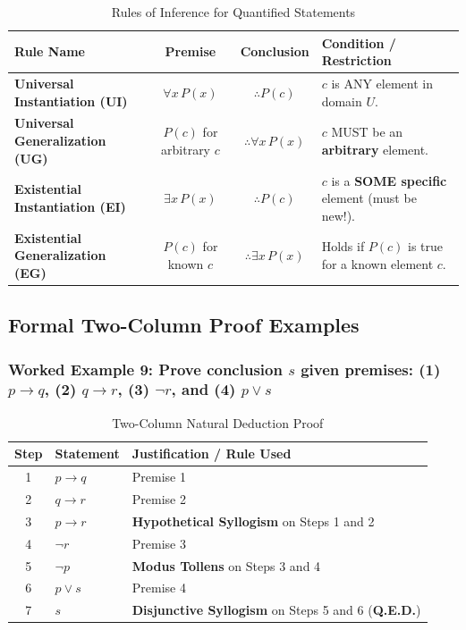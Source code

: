 \documentclass[11pt,a4paper]{article}
\begin{document}
\begin{table}[htbp]
\centering
\small
\begin{tabularx}{\textwidth}{|l|c|c|X|}
\hline
\rowcolor{secondaryteal} \color{white}\textbf{Rule Name} & \color{white}\textbf{Premise} & \color{white}\textbf{Conclusion} & \color{white}\textbf{Condition / Restriction} \\ \hline
\textbf{Universal Instantiation (UI)} & $\forall x \, P(x)$ & $\therefore P(c)$ & $c$ is ANY element in domain $U$. \\ \hline
\textbf{Universal Generalization (UG)} & $P(c)$ for arbitrary $c$ & $\therefore \forall x \, P(x)$ & $c$ MUST be an \textbf{arbitrary} element. \\ \hline
\textbf{Existential Instantiation (EI)} & $\exists x \, P(x)$ & $\therefore P(c)$ & $c$ is a \textbf{SOME specific} element (must be new!). \\ \hline
\textbf{Existential Generalization (EG)} & $P(c)$ for known $c$ & $\therefore \exists x \, P(x)$ & Holds if $P(c)$ is true for a known element $c$. \\ \hline
\end{tabularx}
\caption{Rules of Inference for Quantified Statements}
\end{table}

\subsection{Formal Two-Column Proof Examples}

\subsubsection*{Worked Example 9: Prove conclusion $s$ given premises: (1) $p \rightarrow q$, (2) $q \rightarrow r$, (3) $\neg r$, and (4) $p \lor s$}

\begin{table}[htbp]
\centering
\small
\begin{tabularx}{\textwidth}{|c|X|X|}
\hline
\rowcolor{primaryblue} \color{white}\textbf{Step} & \color{white}\textbf{Statement} & \color{white}\textbf{Justification / Rule Used} \\ \hline
1 & $p \rightarrow q$ & Premise 1 \\ \hline
2 & $q \rightarrow r$ & Premise 2 \\ \hline
3 & $p \rightarrow r$ & \textbf{Hypothetical Syllogism} on Steps 1 and 2 \\ \hline
4 & $\neg r$ & Premise 3 \\ \hline
5 & $\neg p$ & \textbf{Modus Tollens} on Steps 3 and 4 \\ \hline
6 & $p \lor s$ & Premise 4 \\ \hline
7 & \textbf{$s$} & \textbf{Disjunctive Syllogism} on Steps 5 and 6 (\textbf{Q.E.D.}) \\ \hline
\end{tabularx}
\caption{Two-Column Natural Deduction Proof}
\end{table}
\end{document}
